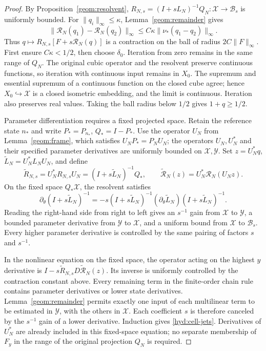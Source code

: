 \begin{proof}
 By Proposition~\ref{geom:resolvent},
 $R_{N,s}=(I+sL_N)^{-1}Q_N:\mathcal X\to\mathcal B_s$ is uniformly
 bounded. For $\|q_i\|_\infty\le\kappa$, Lemma~\ref{geom:remainder} gives
 \[
 \|\mathcal R_N(q_1)-\mathcal R_N(q_2)\|_\infty
       \le C\kappa\|\nu_*(q_1-q_2)\|_\infty.
 \]
 Thus $q\mapsto R_{N,s}[F+s\mathcal R_N(q)]$ is a contraction on the
 ball of radius $2C\|F\|_\infty$. First ensure $C\kappa<1/2$, then
 choose $\delta_0$. Iteration from zero remains in the same range of
 $Q_N$. The original cubic operator and the resolvent preserve
 continuous functions, so iteration with continuous input remains in
 $X_0$. The supremum and essential supremum of a continuous function on
 the closed cube agree; hence $X_0\hookrightarrow\mathcal X$ is a closed
 isometric embedding, and the limit is continuous. Iteration also
 preserves real values. Taking the ball radius below $1/2$ gives
 $1+q\ge1/2$.

 Parameter differentiation requires a fixed projected space. Retain the
 reference state $n_*$ and write $P_*=P_{n_*}$, $Q_*=I-P_*$.
 Use the operator $U_N$ from Lemma~\ref{geom:frame}, which satisfies
 $U_NP_*=P_NU_N$; the operators $U_N,U_N^*$ and their specified parameter
 derivatives are uniformly bounded on $\mathcal X,\mathcal Y$. Set
 $z=U_N^*q$, $\widetilde L_N=U_N^*L_NU_N$, and define
 \[
 \widetilde R_{N,s}=U_N^*R_{N,s}U_N
                  =(I+s\widetilde L_N)^{-1}Q_*,\qquad
 \widetilde{\mathcal R}_N(z)=U_N^*\mathcal R_N(U_Nz).
 \]
 On the fixed space $Q_*\mathcal X$, the resolvent satisfies
 \[
 \partial_\theta(I+s\widetilde L_N)^{-1}
  =-s(I+s\widetilde L_N)^{-1}(\partial_\theta\widetilde L_N)
                       (I+s\widetilde L_N)^{-1}.
 \]
 Reading the right-hand side from right to left gives an $s^{-1}$ gain
 from $\mathcal X$ to $\mathcal Y$, a bounded parameter derivative from
 $\mathcal Y$ to $\mathcal X$, and a uniform bound from $\mathcal X$ to
 $\mathcal B_s$. Every higher parameter derivative is controlled by the
 same pairing of factors $s$ and $s^{-1}$.

 In the nonlinear equation on the fixed space, the operator acting on
 the highest $y$ derivative is
 $I-s\widetilde R_{N,s}D\widetilde{\mathcal R}_N(z)$.
 Its inverse is uniformly controlled by the contraction constant above.
 Every remaining term in the finite-order chain rule contains parameter
 derivatives or lower state derivatives. Lemma~\ref{geom:remainder}
 permits exactly one input of each multilinear term to be estimated in
 $\mathcal Y$, with the others in $\mathcal X$. Each coefficient $s$ is
 therefore canceled by the $s^{-1}$ gain of a lower derivative. Induction
 gives \eqref{hyd:cell-jets}. Derivatives of $U_N^*$ are already included
 in this fixed-space equation; no separate membership of $F_y$ in the
 range of the original projection $Q_N$ is required.


\end{proof}
